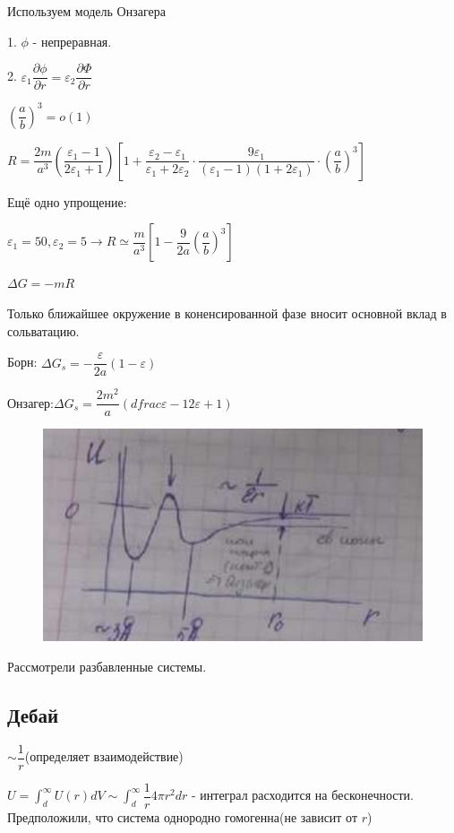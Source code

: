 \begin{lecture}
\begin{lecSection}
\par Используем модель Онзагера
\par 1. $\phi$ - непреравная.
\par 2. $\varepsilon_1 \dfrac{\partial \phi}{\partial r} = \varepsilon_2 \dfrac{\partial \Phi}{\partial r}$
\par $\left(\dfrac{a}{b}\right)^3 = o(1)$
\par $R = \dfrac{2m}{a^3} \left(\dfrac{\varepsilon_1-1}{2 \varepsilon_1 + 1}\right) \left[1 + \dfrac{\varepsilon_2 - \varepsilon_1}{\varepsilon_1 + 2 \varepsilon_2} \cdot \dfrac{9 \varepsilon_1}{(\varepsilon_1 - 1)(1 + 2 \varepsilon_1)} \cdot \left( \dfrac{a}{b}\right)^3 \right]$
\par Ещё одно упрощение:
\par $\varepsilon_1 = 50, \varepsilon_2 = 5 \rightarrow R \simeq \dfrac{m}{a^3} \left[1 - \dfrac{9}{2a} \left(\dfrac{a}{b}\right)^3\right]$
\par $\Delta G = -mR$
\par Только ближайшее окружение в коненсированной фазе вносит основной вклад в сольватацию.

\par Борн: $\Delta G_s = - \dfrac{\varepsilon}{2a}(1-\varepsilon)$
\par Онзагер:$\Delta G_s = \dfrac{2m^2}{a} \left(
dfrac{\varepsilon - 1}{2 \varepsilon + 1}\right)$

	
\begin{figure}[H]
	
	\centering\includegraphics[width=0.6\linewidth]{lecture_09/pic7}
	
	\end{figure}
	
	\par Рассмотрели разбавленные системы.
	
\subsection{Дебай}

$\sim \dfrac{1}{r}$(определяет взаимодействие)
\par $U = \int_{d}^{\infty} U(r)dV \sim \int_{d}^{\infty} \dfrac{1}{r} 4 \pi r^2 dr$ - интеграл расходится на бесконечности. Предположили, что система однородно гомогенна(не зависит от $r$)	


\end{lecSection}
\end{lecture}
